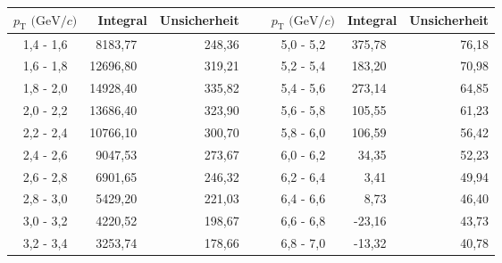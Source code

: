 \begin{table}[]
	\centering

\begin{tabular}{ | c || r | r ||  l  || c || r | r | }
		\hline
		$p_\text{T} \text{ (GeV}/c)$ & Integral & Unsicherheit & \ & $p_\text{T} \text{ (GeV}/c)$ & Integral & Unsicherheit \\ \hline
		1,4 - 1,6 & 8183,77 \  & 248,36 \hspace{3mm}  & \ &  5,0 - 5,2 & 375,78 \ & 76,18 \hspace{3mm} \\ \hline
		1,6 - 1,8 & 12696,80 \ & 319,21 \hspace{3mm} & \ &  5,2 - 5,4 & 183,20 \ & 70,98 \hspace{3mm} \\ \hline
		1,8 - 2,0 & 14928,40 \ & 335,82 \hspace{3mm} & \ &  5,4 - 5,6 & 273,14 \ & 64,85 \hspace{3mm} \\ \hline
		2,0 - 2,2 & 13686,40 \ & 323,90 \hspace{3mm} & \ &  5,6 - 5,8 & 105,55 \ & 61,23 \hspace{3mm} \\ \hline
		2,2 - 2,4 & 10766,10 \ & 300,70 \hspace{3mm} & \ &  5,8 - 6,0 & 106,59 \ & 56,42 \hspace{3mm} \\ \hline
		2,4 - 2,6 & 9047,53 \  & 273,67 \hspace{3mm} & \ &  6,0 - 6,2 & 34,35 \  & 52,23 \hspace{3mm} \\ \hline
		2,6 - 2,8 & 6901,65 \  & 246,32 \hspace{3mm} & \ &  6,2 - 6,4 & 3,41 \   & 49,94 \hspace{3mm} \\ \hline
		2,8 - 3,0 & 5429,20 \  & 221,03 \hspace{3mm} & \ &  6,4 - 6,6 & 8,73 \   & 46,40 \hspace{3mm} \\ \hline
		3,0 - 3,2 & 4220,52 \  & 198,67 \hspace{3mm} & \ &  6,6 - 6,8 & -23,16 \ & 43,73 \hspace{3mm} \\ \hline
		3,2 - 3,4 & 3253,74 \ & 178,66 \hspace{3mm} & \ &  6,8 - 7,0 & -13,32 \ & 40,78 \hspace{3mm} \\ \hline

\end{tabular}
\end{table}
